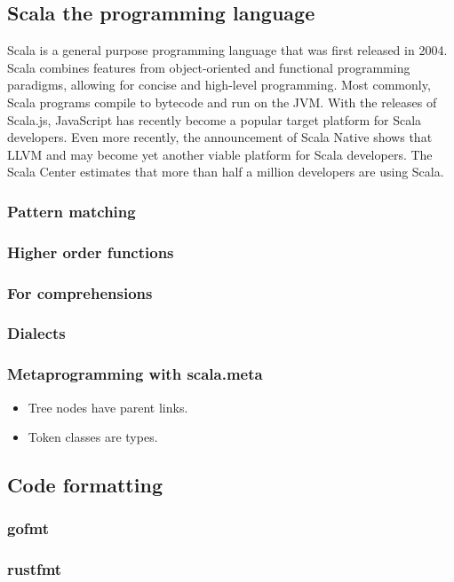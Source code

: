 \documentclass[11pt,a4paper]{article}
\begin{document}
\subsection{Scala the programming language}
Scala\autocite{odersky_scala_2004} is a general purpose programming language that was first released in 2004.
Scala combines features from object-oriented and functional programming paradigms, allowing for concise and high-level programming.
Most commonly, Scala programs compile to bytecode and run on the JVM.
With the releases of Scala.js\autocite{_scala.js_????-1}, JavaScript has recently become a popular target platform for Scala developers.
Even more recently, the announcement of Scala Native\autocite{_scala-native/scala-native_????} shows that LLVM and may become yet another viable platform for Scala developers.
The Scala Center estimates that more than half a million developers are using Scala\autocite{scala-center}.
\subsubsection{Pattern matching}
\subsubsection{Higher order functions}
\subsubsection{For comprehensions}
\subsubsection{Dialects}
\subsubsection{Metaprogramming with scala.meta}
\begin{itemize}
  \item Tree nodes have parent links.
  \item Token classes are types.
\end{itemize}
\subsection{Code formatting}
\subsubsection{gofmt}
\subsubsection{rustfmt}
\end{document}
